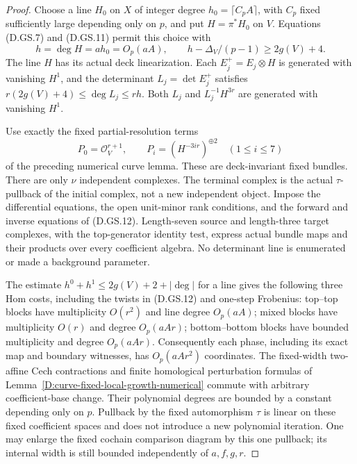 \begin{proof}
Choose a line \(H_0\) on \(X\) of integer degree
\(h_0=\lceil C_p A\rceil\), with \(C_p\) fixed
sufficiently large depending only on \(p\), and put
\(H=\pi^*H_0\) on \(V\).
Equations (D.GS.7) and (D.GS.11) permit this choice
with
\[
 h=\deg H=ah_0=O_p(aA),\qquad
 h-\Delta_V/(p-1)\ge2g(V)+4.
                                                        \tag{D.GS.14}
\]
The line \(H\) has its actual deck linearization.
Each \(E_j^+=E_j\otimes H\) is generated with vanishing
\(H^1\), and the determinant \(L_j=\det E_j^+\) satisfies
\(r(2g(V)+4)\le\deg L_j\le rh\).
Both \(L_j\) and \(L_j^{-1}H^{3r}\) are generated
with vanishing \(H^1\).

Use exactly the fixed partial-resolution terms
\[
 P_0=\mathcal O_V^{r+1},\qquad
 P_i=(H^{-3ir})^{\oplus2}\quad(1\le i\le7)
                                                        \tag{D.GS.15}
\]
of the preceding numerical curve lemma.
These are deck-invariant fixed bundles.
There are only \(\nu\) independent complexes.
The terminal complex is the actual \(\tau\)-pullback
of the initial complex, not a new independent object.
Impose the differential equations, the open unit-minor
rank conditions, and the forward and inverse equations
of (D.GS.12). Length-seven source and length-three
target complexes, with the top-generator identity
test, express actual bundle maps and their products
over every coefficient algebra. No determinant
line is enumerated or made a background parameter.

The estimate \(h^0+h^1\le2g(V)+2+|\deg|\) for a
line gives the following three Hom costs, including
the twists in (D.GS.12) and one-step Frobenius:
top--top blocks have multiplicity \(O(r^2)\) and
line degree \(O_p(aA)\); mixed blocks have
multiplicity \(O(r)\) and degree \(O_p(aAr)\);
bottom--bottom blocks have bounded multiplicity
and degree \(O_p(aAr)\).
Consequently each phase, including its exact
map and boundary witnesses, has \(O_p(aAr^2)\) coordinates.
The fixed-width two-affine Cech contractions and
finite homological perturbation formulas of
Lemma~\ref{D:curve-fixed-local-growth-numerical}
commute with arbitrary coefficient-base change.
Their polynomial degrees are bounded by a constant
depending only on \(p\). Pullback by the fixed
automorphism \(\tau\) is linear on these fixed
coefficient spaces and does not introduce a new
polynomial iteration. One may enlarge the fixed
cochain comparison diagram by this one pullback;
its internal width is still bounded independently
of \(a,f,g,r\).


\end{proof}
